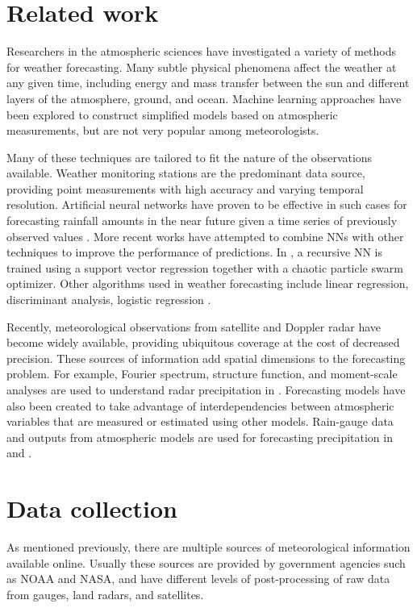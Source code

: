 \documentclass{article}
\begin{document}
\section{Related work} 
 
Researchers in the atmospheric sciences have investigated a variety of methods
for weather forecasting. Many subtle physical phenomena affect the weather at
any given time, including energy and mass transfer between the sun and different
layers of the atmosphere, ground, and ocean. Machine learning approaches have
been explored to construct simplified models based on atmospheric measurements,
but are not very popular among meteorologists.

Many of these techniques are tailored to fit the nature of the observations
available. Weather monitoring stations are the predominant data source,
providing point measurements with high accuracy and varying temporal resolution.
Artificial neural networks have proven to be effective in such cases for
forecasting rainfall amounts in the near future given a time series of
previously observed values \cite{maier2000}. More recent works have attempted to
combine NNs with other techniques to improve the performance of predictions. In
\cite{hong2008}, a recursive NN is trained using a support vector regression
together with a chaotic particle swarm optimizer. Other algorithms used in
weather forecasting include linear regression, discriminant analysis, logistic
regression \cite{applequist2002}.

Recently, meteorological observations from satellite and Doppler radar have
become widely available, providing ubiquitous coverage at the cost of decreased
precision. These sources of information add spatial dimensions to the
forecasting problem. For example, Fourier spectrum, structure function, and
moment-scale analyses are used to understand radar precipitation in
\cite{harris2007}. Forecasting models have also been created to take advantage
of interdependencies between atmospheric variables that are measured or
estimated using other models. Rain-gauge data and outputs from atmospheric
models are used for forecasting precipitation in \cite{kuligowski1998} and
\cite{ramirez2005}.

\section{Data collection}

As mentioned previously, there are multiple sources of meteorological
information available online. Usually these sources are provided by government
agencies such as NOAA and NASA, and have different levels of post-processing of
raw data from gauges, land radars, and satellites.
\end{document}

